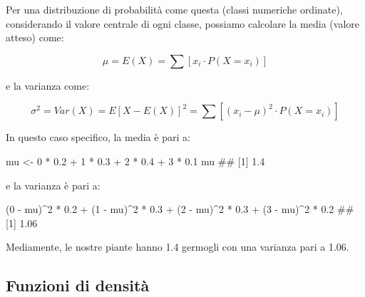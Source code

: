 \documentclass[a4paper,12pt,oneside]{book}
\newenvironment{Shaded}{}{}
\newcommand{\DecValTok}[1]{#1}
\newcommand{\FloatTok}[1]{#1}
\newcommand{\StringTok}[1]{#1}
\newcommand{\CommentTok}[1]{#1}
\newcommand{\OperatorTok}[1]{#1}
\newcommand{\NormalTok}[1]{#1}
\begin{document}
Per una distribuzione di probabilità come questa (classi numeriche ordinate), considerando il valore centrale di ogni classe, possiamo calcolare la media (valore atteso) come:

\[
\mu  = E(X) = \sum{\left[ x_i \cdot P(X = x_i ) \right]}
\]

e la varianza come:

\[\sigma ^2  = Var(X) = E\left[ {X - E(X)} \right]^2  = \sum{ \left[ {\left( {x_i  - \mu } \right)^2 \cdot P(X = x_i )} \right]}\]

In questo caso specifico, la media è pari a:

\begin{Shaded}
\begin{Highlighting}[]
\NormalTok{mu <-}\StringTok{ }\DecValTok{0} \OperatorTok{*}\StringTok{ }\FloatTok{0.2} \OperatorTok{+}\StringTok{ }\DecValTok{1} \OperatorTok{*}\StringTok{ }\FloatTok{0.3} \OperatorTok{+}\StringTok{ }\DecValTok{2} \OperatorTok{*}\StringTok{ }\FloatTok{0.4} \OperatorTok{+}\StringTok{ }\DecValTok{3} \OperatorTok{*}\StringTok{ }\FloatTok{0.1}
\NormalTok{mu}
\CommentTok{## [1] 1.4}
\end{Highlighting}
\end{Shaded}

e la varianza è pari a:

\begin{Shaded}
\begin{Highlighting}[]
\NormalTok{(}\DecValTok{0} \OperatorTok{-}\StringTok{ }\NormalTok{mu)}\OperatorTok{^}\DecValTok{2} \OperatorTok{*}\StringTok{ }\FloatTok{0.2} \OperatorTok{+}\StringTok{ }\NormalTok{(}\DecValTok{1} \OperatorTok{-}\StringTok{ }\NormalTok{mu)}\OperatorTok{^}\DecValTok{2} \OperatorTok{*}\StringTok{ }\FloatTok{0.3} \OperatorTok{+}\StringTok{ }\NormalTok{(}\DecValTok{2} \OperatorTok{-}\StringTok{ }\NormalTok{mu)}\OperatorTok{^}\DecValTok{2} \OperatorTok{*}\StringTok{ }\FloatTok{0.3} \OperatorTok{+}
\StringTok{  }\NormalTok{(}\DecValTok{3} \OperatorTok{-}\StringTok{ }\NormalTok{mu)}\OperatorTok{^}\DecValTok{2} \OperatorTok{*}\StringTok{ }\FloatTok{0.2}
\CommentTok{## [1] 1.06}
\end{Highlighting}
\end{Shaded}

Mediamente, le nostre piante hanno 1.4 germogli con una varianza pari a 1.06.

\hypertarget{funzioni-di-densita}{%
\subsection{Funzioni di densità}\label{funzioni-di-densita}}
\end{document}
